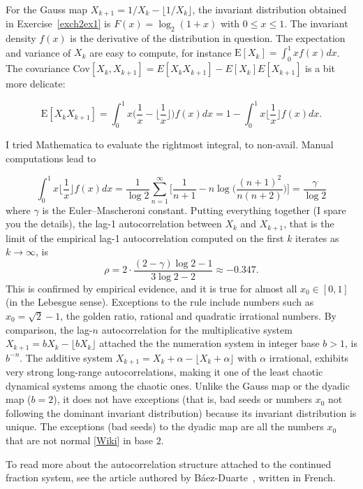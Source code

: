 \documentclass[oneside,10pt]{book}
\begin{document}
For the Gauss map $X_{k+1}=1/X_k-\lfloor 1/X_k\rfloor$, the invariant distribution obtained in Exercise~\ref{exch2ex1} is $F(x)=\log_2(1+x)$ with $0\leq x \leq 1$. The invariant density $f(x)$ is the derivative of the distribution in question.  The expectation and variance of $X_k$ are easy to compute, for instance $\text{E}[X_k]=\int_0^1 x f(x)dx$. The 
covariance $\text{Cov}[X_k,X_{k+1}]=E[X_k X_{k+1}]-E[X_k]E[X_{k+1}]$ is a bit more delicate:  

$$\text{E}[X_k X_{k+1}]=\int_0^1 x\Bigg(\frac{1}{x}-\Bigg\lfloor\frac{1}{x}\Bigg\rfloor\Bigg)f(x)dx=1-\int_0^1 x\Bigg\lfloor\frac{1}{x}\Bigg\rfloor f(x)dx.$$

\noindent I tried Mathematica to evaluate the rightmost integral, to non-avail. Manual computations lead to

$$\int_0^1 x\Bigg\lfloor\frac{1}{x}\Bigg\rfloor f(x)dx =\frac{1}{\log 2}\sum_{n=1}^\infty \Bigg[\frac{1}{n+1}-n\log\Bigg(\frac{(n+1)^2}{n(n+2)}\Bigg)\Bigg] =\frac{\gamma}{\log 2} $$
where $\gamma$ is the Euler–Mascheroni constant. Putting everything together (I spare you the details), the lag-1 autocorrelation between $X_k$ and $X_{k+1}$, that is the limit of the empirical lag-1 autocorrelation computed on the first $k$ iterates as $k\rightarrow\infty$, is 
\begin{equation}
\rho=2\cdot \frac{(2-\gamma)\log 2 - 1}{3\log 2 - 2} \approx -0.347. \label{fritesdur}
\end{equation}
This is confirmed by empirical evidence, and it is true for almost all $x_0\in [0, 1]$ (in the Lebesgue sense). Exceptions to the rule include numbers such as $x_0=\sqrt{2}-1$, the golden ratio, rational and quadratic irrational numbers. By comparison, the lag-$n$ autocorrelation for the multiplicative system $X_{k+1}=bX_k-\lfloor bX_k\rfloor$ attached the the numeration system in integer base $b>1$, is $b^{-n}$. The additive system $X_{k+1}=X_k+\alpha - \lfloor X_k +\alpha\rfloor$ with $\alpha$ irrational, exhibits very strong long-range autocorrelations, making it one of the least chaotic dynamical systems among the chaotic ones. Unlike the Gauss map or the dyadic map ($b=2$), it does not have exceptions (that is, bad seeds or numbers $x_0$ not following the dominant invariant distribution) because its invariant distribution is unique. The exceptions (bad seeds) to the dyadic map are all the numbers $x_0$ that are not \textcolor{index}{normal} 
[\href{https://en.wikipedia.org/wiki/Normal_number}{Wiki}] in base $2$.

To read more about the autocorrelation structure attached to the continued fraction system, see the article authored by Báez-Duarte~\cite{autocorr2005}, written in French.
\end{document}
